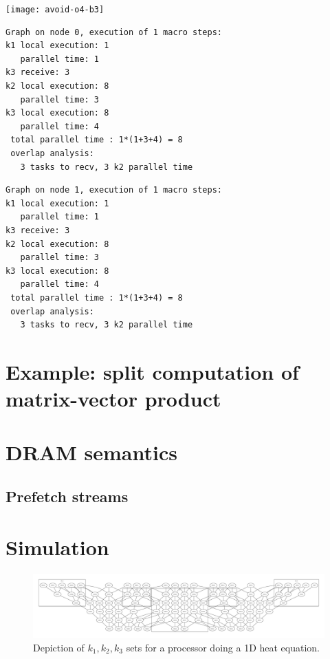 \documentclass[11pt,fleqn,preprint]{impreport}
\begin{document}
\vfill\pagebreak
\texttt{[image: avoid-o4-b3]}

\begin{multicols}{2}
\begin{verbatim}
Graph on node 0, execution of 1 macro steps:
k1 local execution: 1
   parallel time: 1
k3 receive: 3
k2 local execution: 8
   parallel time: 3
k3 local execution: 8
   parallel time: 4
 total parallel time : 1*(1+3+4) = 8
 overlap analysis:
   3 tasks to recv, 3 k2 parallel time
\end{verbatim}
\vfill\columnbreak
\begin{verbatim}
Graph on node 1, execution of 1 macro steps:
k1 local execution: 1
   parallel time: 1
k3 receive: 3
k2 local execution: 8
   parallel time: 3
k3 local execution: 8
   parallel time: 4
 total parallel time : 1*(1+3+4) = 8
 overlap analysis:
   3 tasks to recv, 3 k2 parallel time
\end{verbatim}

\end{multicols}

\section{Example: split computation of matrix-vector product}


\section{DRAM semantics}

\subsection{Prefetch streams}


\section{Simulation}

\begin{figure}[p]
  \includegraphics[scale=.17,angle=90]{nodegraph-1}
  \caption{Depiction of $k_1,k_2,k_3$ sets for a processor doing a 1D
    heat equation.}
  \label{fig:1dk123}
\end{figure}
\end{document}
